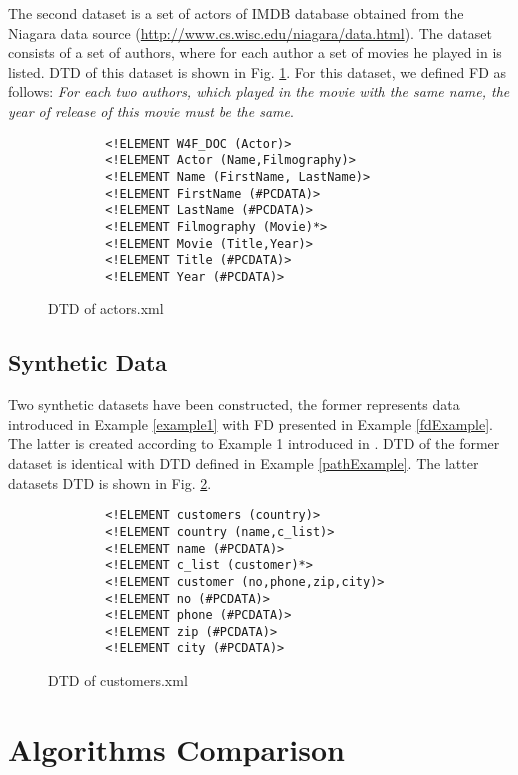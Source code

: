 The second dataset is a set of actors of IMDB database obtained from the Niagara data source (\url{http://www.cs.wisc.edu/niagara/data.html}). The dataset consists of a set of authors, where for each author a set of movies he played in is listed. DTD of this dataset is shown in Fig. \ref{actorsDTD}. For this dataset, we defined FD as follows: \emph{For each two authors, which played in the movie with the same name, the year of release of this movie must be the same}.

\begin{figure}[H]
    \begin{verbatim}
        <!ELEMENT W4F_DOC (Actor)>
        <!ELEMENT Actor (Name,Filmography)>
        <!ELEMENT Name (FirstName, LastName)>
        <!ELEMENT FirstName (#PCDATA)>
        <!ELEMENT LastName (#PCDATA)>
        <!ELEMENT Filmography (Movie)*>
        <!ELEMENT Movie (Title,Year)>
        <!ELEMENT Title (#PCDATA)>
        <!ELEMENT Year (#PCDATA)>
    \end{verbatim}
    \caption{DTD of actors.xml}
    \label{actorsDTD}
\end{figure}

\subsection{Synthetic Data}

Two synthetic datasets have been constructed, the former represents data introduced in Example \ref{example1} with FD presented in Example \ref{fdExample}. The latter is created according to Example 1 introduced in \cite{ImprovingXML}. DTD of the former dataset is identical with DTD defined in Example \ref{pathExample}. The latter datasets DTD is shown in Fig. \ref{synthDTD}.

\begin{figure}[H]
    \begin{verbatim}
        <!ELEMENT customers (country)>
        <!ELEMENT country (name,c_list)>
        <!ELEMENT name (#PCDATA)>
        <!ELEMENT c_list (customer)*>
        <!ELEMENT customer (no,phone,zip,city)>
        <!ELEMENT no (#PCDATA)>
        <!ELEMENT phone (#PCDATA)>
        <!ELEMENT zip (#PCDATA)>
        <!ELEMENT city (#PCDATA)>
    \end{verbatim}
    \caption{DTD of customers.xml}
    \label{synthDTD}
\end{figure}

\section{Algorithms Comparison}

